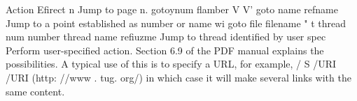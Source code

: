 Action Efirect 
 n Jump to page n. 
gotoynum flamber V V’ 
goto name {refname} Jump to a point established as number or name 
wi 
goto file {filename} " t 
thread num {number} 
thread name {refiuzme} Jump to thread identified by 
user {spec} Perform user-specified action. Section 6.9 of the 
PDF manual explains the possibilities. A typical 
use of this is to specify a URL, for example, / S 
/URI /URI (http: //www . tug. org/) 
in which case it will make several links with the same content.
